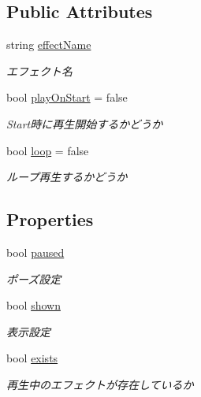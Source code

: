 \subsection*{Public Attributes}
\begin{DoxyCompactItemize}
\item 
string \hyperlink{class_effekseer_emitter_a3c52af81c057a2f4ea0848cb492cf208}{effect\-Name}
\begin{DoxyCompactList}\small\item\em エフェクト名 \end{DoxyCompactList}\item 
bool \hyperlink{class_effekseer_emitter_a8ff5bc48852b4a21e3b33b0cd0e8b65a}{play\-On\-Start} = false
\begin{DoxyCompactList}\small\item\em Start時に再生開始するかどうか \end{DoxyCompactList}\item 
bool \hyperlink{class_effekseer_emitter_a9b6a18e54c4b4a68bb9b81fc88b123bd}{loop} = false
\begin{DoxyCompactList}\small\item\em ループ再生するかどうか \end{DoxyCompactList}\end{DoxyCompactItemize}
\subsection*{Properties}
\begin{DoxyCompactItemize}
\item 
bool \hyperlink{class_effekseer_emitter_a5979b4e756a1f31e439752de6fb86c64}{paused}
\begin{DoxyCompactList}\small\item\em ポーズ設定 \end{DoxyCompactList}\item 
bool \hyperlink{class_effekseer_emitter_a8beed88f3cb7357c4eb088847a6d1fbc}{shown}
\begin{DoxyCompactList}\small\item\em 表示設定 \end{DoxyCompactList}\item 
bool \hyperlink{class_effekseer_emitter_aa4b49f6d532b7e75f2d207866ecee574}{exists}
\begin{DoxyCompactList}\small\item\em 再生中のエフェクトが存在しているか \end{DoxyCompactList}\end{DoxyCompactItemize}


